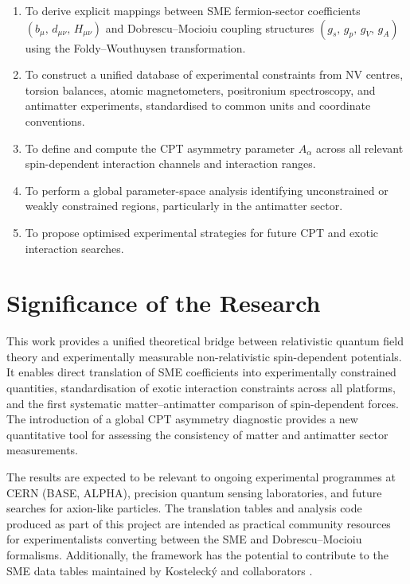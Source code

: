 \documentclass[main]{subfiles}
\begin{document}
\begin{enumerate}
  \item To derive explicit mappings between SME fermion-sector coefficients
    $(b_{\mu},\, d_{\mu\nu},\, H_{\mu\nu})$ and Dobrescu--Mocioiu coupling
    structures $(g_{s},\, g_{p},\, g_{V},\, g_{A})$ using the
    Foldy--Wouthuysen transformation.
  \item To construct a unified database of experimental constraints from NV
    centres, torsion balances, atomic magnetometers, positronium spectroscopy,
    and antimatter experiments, standardised to common units and coordinate
    conventions.
  \item To define and compute the CPT asymmetry parameter $A_{\alpha}$ across
    all relevant spin-dependent interaction channels and interaction ranges.
  \item To perform a global parameter-space analysis identifying unconstrained
    or weakly constrained regions, particularly in the antimatter sector.
  \item To propose optimised experimental strategies for future CPT and exotic
    interaction searches.
\end{enumerate}

\section{Significance of the Research}

This work provides a unified theoretical bridge between relativistic quantum
field theory and experimentally measurable non-relativistic spin-dependent
potentials. It enables direct translation of SME coefficients into
experimentally constrained quantities, standardisation of exotic interaction
constraints across all platforms, and the first systematic matter--antimatter
comparison of spin-dependent forces. The introduction of a global CPT asymmetry
diagnostic provides a new quantitative tool for assessing the consistency of
matter and antimatter sector measurements.

The results are expected to be relevant to ongoing experimental programmes at
CERN (BASE, ALPHA), precision quantum sensing laboratories, and future searches
for axion-like particles. The translation tables and analysis code produced as
part of this project are intended as practical community resources for
experimentalists converting between the SME and Dobrescu--Mocioiu formalisms.
Additionally, the framework has the potential to contribute to the SME data
tables maintained by Kosteleck\'{y} and collaborators \cite{Kostelecky2011}.
\end{document}
